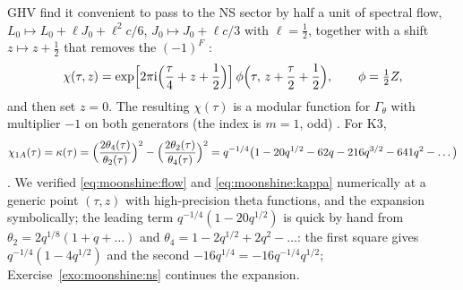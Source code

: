 GHV find it convenient to pass to the NS sector by half a unit of spectral flow,
$L_0\mapsto L_0+\ell J_0+\ell^2c/6$, $J_0\mapsto J_0+\ell c/3$ with $\ell=\tfrac12$, together
with a shift $z\mapsto z+\tfrac12$ that removes the $(-1)^F$ :
\begin{equation}\label{eq:moonshine:flow}
  \chi(\tau,z)=\exp\Bigl[2\pi\mathrm{i}\Bigl(\frac\tau4+z+\frac12\Bigr)\Bigr]\,
  \phi\Bigl(\tau,\,z+\frac\tau2+\frac12\Bigr),\qquad \phi=\tfrac12Z,
\end{equation}
and then set $z=0$. The resulting $\chi(\tau)$ is a modular function for $\Gamma_\theta$
with multiplier $-1$ on both generators (the index is $m=1$, odd)
. For K3,
\begin{equation}\label{eq:moonshine:kappa}
  \chi_{1A}(\tau)=\kappa(\tau)=\Bigl(\frac{2\theta_4(\tau)}{\theta_2(\tau)}\Bigr)^2
  -\Bigl(\frac{2\theta_2(\tau)}{\theta_4(\tau)}\Bigr)^2
  =q^{-1/4}\bigl(1-20q^{1/2}-62q-216q^{3/2}-641q^2-\dots\bigr)
\end{equation}
. We verified \eqref{eq:moonshine:flow} and
\eqref{eq:moonshine:kappa} numerically at a generic point $(\tau,z)$ with high-precision
theta functions, and the expansion symbolically; the leading term
$q^{-1/4}(1-20q^{1/2})$ is quick by hand from $\theta_2=2q^{1/8}(1+q+\dots)$ and
$\theta_4=1-2q^{1/2}+2q^2-\dots$: the first square gives $q^{-1/4}(1-4q^{1/2})$ and the
second $-16q^{1/4}=-16q^{-1/4}q^{1/2}$; Exercise~\ref{exo:moonshine:ns} continues the
expansion.

